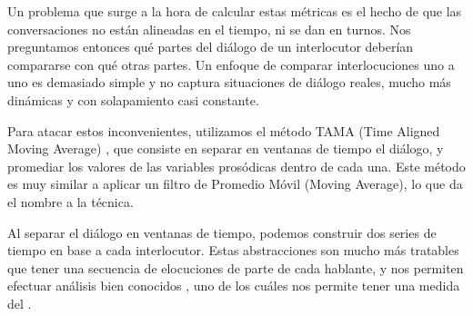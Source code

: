Un problema que surge a la hora de calcular estas métricas es el hecho de que las conversaciones no están alineadas en el tiempo, ni se dan en turnos. Nos preguntamos entonces qué partes del diálogo de un interlocutor deberían compararse con qué otras partes. Un enfoque de comparar interlocuciones uno a uno es demasiado simple y no captura situaciones de diálogo reales, mucho más dinámicas y con solapamiento casi constante.

Para atacar estos inconvenientes, utilizamos el método TAMA (Time Aligned Moving Average) \cite{KOU2008}, que consiste en separar en ventanas de tiempo el diálogo, y promediar los valores de las variables prosódicas dentro de cada una. Este método es muy similar a aplicar un filtro de Promedio Móvil (Moving Average), lo que da el nombre a la técnica.

Al separar el diálogo en ventanas de tiempo, podemos construir dos series de tiempo en base a cada interlocutor. Estas abstracciones son mucho más tratables que tener una secuencia de elocuciones de parte de cada hablante, y nos permiten efectuar análisis bien conocidos \cite{CHATFIELD}, uno de los cuáles nos permite tener una medida del \entrainment.

